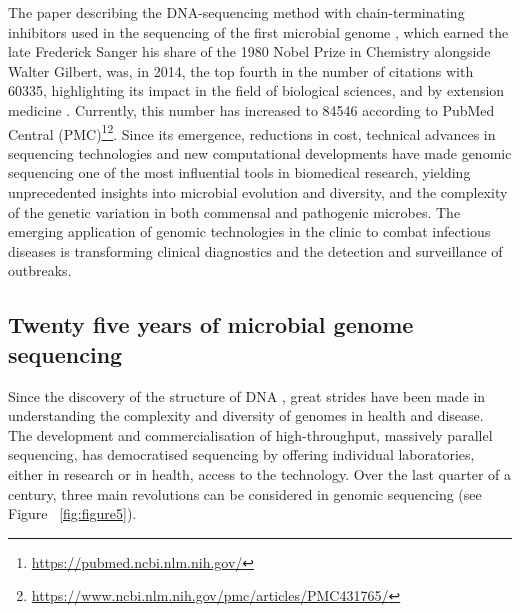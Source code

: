 The paper describing the DNA-sequencing method with chain-terminating inhibitors used in the sequencing of the first microbial genome \citep{sanger_dna_1977}, which earned the late Frederick Sanger his share of the 1980 Nobel Prize in Chemistry alongside Walter Gilbert, was, in 2014, the top fourth in the number of citations with 60335, highlighting its impact in the field of biological sciences, and by extension medicine \citep{van_noorden_top_2014}. 
Currently, this number has increased to 84546 according to PubMed Central\textsuperscript{\small\textregistered} (PMC)\footnote{\url{https://pubmed.ncbi.nlm.nih.gov/}}\footnote{\url{ https://www.ncbi.nlm.nih.gov/pmc/articles/PMC431765/}}. 
Since its emergence, reductions in cost, technical advances in sequencing technologies and new computational developments have made genomic sequencing one of the most influential tools in biomedical research, yielding unprecedented insights into microbial evolution and diversity, and the complexity of the genetic variation in both commensal and pathogenic microbes. 
The emerging application of genomic technologies in the clinic to combat infectious diseases is transforming clinical diagnostics and the detection and surveillance of outbreaks. 

\subsection{Twenty five years of microbial genome sequencing} \label{ssec:sequencing}

Since the discovery of the structure of DNA \citep{watson_molecular_1953}, great strides have been made in understanding the complexity and diversity of genomes in health and disease. 
The development and commercialisation of high-throughput, massively parallel sequencing, has democratised sequencing by offering individual laboratories, either in research or in health, access to the technology. 
Over the last quarter of a century, three main revolutions can be considered in genomic sequencing (see Figure ~\ref{fig:figure5}).

